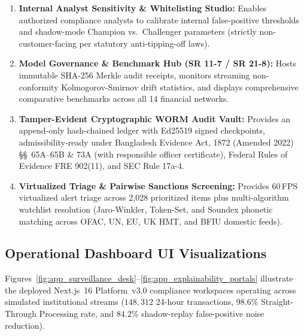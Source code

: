 \begin{enumerate}
\begin{itemize}
        \item \textit{BFIU Statutory STR Compliance} (Bangladesh Bank MLPA 2012 \S\ 25, Master Circular No.~26, Circular No.~24 TBML, and 2026 Circulars 32 \& 02/03/05).
        \item \textit{Statutory Anti-Tipping-Off RFI Gate} blocking prohibited SAR/AML disclosure phrases under 31 U.S.C.\ \S\ 5318(g)(2) and MLPA 2012 \S\ 6.
    \end{itemize}
    \item \textbf{Internal Analyst Sensitivity \& Whitelisting Studio:} Enables authorized compliance analysts to calibrate internal false-positive thresholds and shadow-mode Champion vs.\ Challenger parameters (strictly non-customer-facing per statutory anti-tipping-off laws).
    \item \textbf{Model Governance \& Benchmark Hub (SR 11-7 / SR 21-8):} Hosts immutable SHA-256 Merkle audit receipts, monitors streaming non-conformity Kolmogorov-Smirnov drift statistics, and displays comprehensive comparative benchmarks across all 14 financial networks.
    \item \textbf{Tamper-Evident Cryptographic WORM Audit Vault:} Provides an append-only hash-chained ledger with Ed25519 signed checkpoints, admissibility-ready under Bangladesh Evidence Act, 1872 (Amended 2022) \S\S\ 65A--65B \& 73A (with responsible officer certificate), Federal Rules of Evidence FRE 902(11), and SEC Rule 17a-4.
    \item \textbf{Virtualized Triage \& Pairwise Sanctions Screening:} Provides 60\,FPS virtualized alert triage across 2,028 prioritized items plus multi-algorithm watchlist resolution (Jaro-Winkler, Token-Set, and Soundex phonetic matching across OFAC, UN, EU, UK HMT, and BFIU domestic feeds).
\end{enumerate}

\subsection{Operational Dashboard UI Visualizations}
Figures~\ref{fig:app_surveillance_desk}--\ref{fig:app_explainability_portals} illustrate the deployed Next.js~16 Platform~v3.0 compliance workspaces operating across simulated institutional streams ($148,312$ 24-hour transactions, $98.6\%$ Straight-Through Processing rate, and $84.2\%$ shadow-replay false-positive noise reduction).

